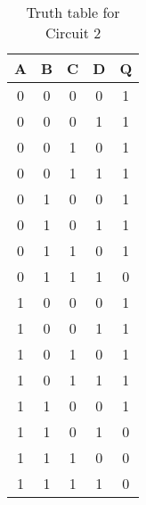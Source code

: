\documentclass[12pt]{article}
\begin{document}
\begin{table}[H]
	\centering
	\begin{tabular}{|c|c|c|c|c|}
		\hline
		\textbf{A} & \textbf{B} & \textbf{C} & \textbf{D} & \textbf{Q} \\
		\hline \hline
		0 & 0 & 0 & 0 & 1 \\
		\hline
		0 & 0 & 0 & 1 & 1 \\
		\hline
		0 & 0 & 1 & 0 & 1 \\
		\hline
		0 & 0 & 1 & 1 & 1 \\
		\hline
		0 & 1 & 0 & 0 & 1 \\
		\hline
		0 & 1 & 0 & 1 & 1 \\
		\hline
		0 & 1 & 1 & 0 & 1 \\
		\hline
		0 & 1 & 1 & 1 & 0 \\
		\hline
		1 & 0 & 0 & 0 & 1 \\
		\hline
		1 & 0 & 0 & 1 & 1 \\
		\hline
		1 & 0 & 1 & 0 & 1 \\
		\hline
		1 & 0 & 1 & 1 & 1 \\
		\hline
		1 & 1 & 0 & 0 & 1 \\
		\hline
		1 & 1 & 0 & 1 & 0 \\
		\hline
		1 & 1 & 1 & 0 & 0 \\
		\hline
		1 & 1 & 1 & 1 & 0 \\
		\hline
	\end{tabular}
\caption{Truth table for Circuit 2}
\end{table}
\end{document}
